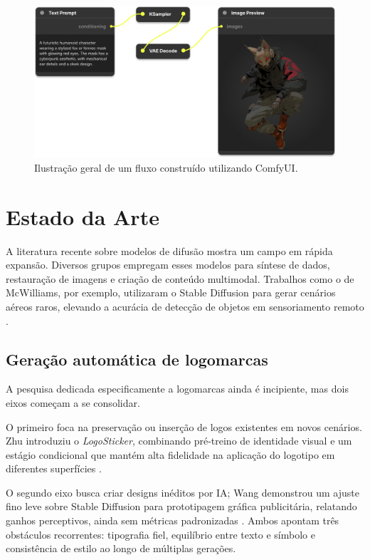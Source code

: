 \documentclass[12pt, %
openright, 
oneside, %
a4paper,    %
brazil]{facom-ufu-abntex2}
\begin{document}
\begin{figure}[H]
    \centering
    \includegraphics[width=\linewidth]{comfyui.png}
    \caption{Ilustração geral de um fluxo construído utilizando ComfyUI.}
    \label{fig:comfyUI1}
\end{figure}

\section{Estado da Arte}

A literatura recente sobre modelos de difusão mostra um campo em rápida expansão. Diversos grupos empregam esses modelos para síntese de dados, restauração de imagens e criação de conteúdo multimodal. Trabalhos como o de McWilliams, por exemplo, utilizaram o Stable Diffusion para gerar cenários aéreos raros, elevando a acurácia de detecção de objetos em sensoriamento remoto \cite{mcwilliams2024diffusionaugmentation}.

\subsection{Geração automática de logomarcas}

A pesquisa dedicada especificamente a logomarcas ainda é incipiente, mas dois eixos começam a se consolidar.

O primeiro foca na preservação ou inserção de logos existentes em novos cenários. Zhu introduziu o \textit{LogoSticker}, combinando pré-treino de identidade visual e um estágio condicional que mantém alta fidelidade na aplicação do logotipo em diferentes superfícies \cite{zhu2024logostickerinsertinglogosdiffusion}.

O segundo eixo busca criar designs inéditos por IA; Wang demonstrou um ajuste fino leve sobre Stable Diffusion para prototipagem gráfica publicitária, relatando ganhos perceptivos, ainda sem métricas padronizadas \cite{gao2024dtia}. Ambos apontam três obstáculos recorrentes: tipografia fiel, equilíbrio entre texto e símbolo e consistência de estilo ao longo de múltiplas gerações.
\end{document}
